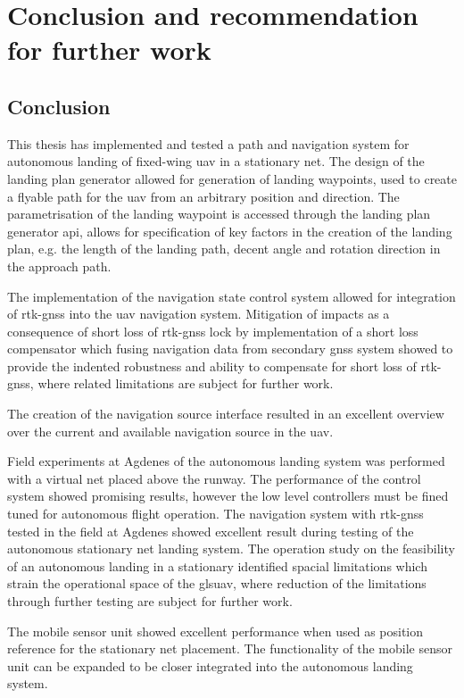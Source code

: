 \chapter{Conclusion and recommendation for further work}
\section{Conclusion}
This thesis has implemented and tested a path and navigation system for autonomous landing of fixed-wing \gls{uav} in a stationary net. The design of the landing plan generator allowed for generation of landing waypoints, used to create a flyable path for the \gls{uav} from an arbitrary position and direction. The parametrisation of the landing waypoint is accessed through the landing plan generator \gls{api}, allows for specification of key factors in the creation of the landing plan, e.g. the length of the landing path, decent angle and rotation direction in the approach path.

The implementation of the navigation state control system allowed for integration of \gls{rtk-gnss} into the \gls{uav} navigation system. Mitigation of impacts as a consequence of short loss of \gls{rtk-gnss} lock by implementation of a short loss compensator which fusing navigation data from secondary \gls{gnss} system showed to provide the indented robustness and ability to compensate for short loss of \gls{rtk-gnss}, where related limitations are subject for further work.

The creation of the navigation source interface resulted in an excellent overview over the current and available navigation source in the \gls{uav}. 

Field experiments at Agdenes of the autonomous landing system was performed with a virtual net placed above the runway. The performance of the control system showed promising results, however the low level controllers must be fined tuned for autonomous flight operation. The navigation system with \gls{rtk-gnss} tested in the field at Agdenes showed excellent result during testing of the autonomous stationary net landing system. The operation study on the feasibility of an autonomous landing in a stationary identified spacial limitations which strain the operational space of the gls{uav}, where reduction of the limitations through further testing are subject for further work.  

The mobile sensor unit showed excellent performance when used as position reference for the stationary net placement. The functionality of the mobile sensor unit can be expanded to be closer integrated into the autonomous landing system.

